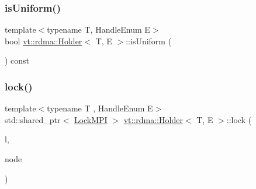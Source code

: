 \mbox{\label{structvt_1_1rdma_1_1_holder_af5a5f41fb16fbf8ee0f7f1b51120cb65}} 
\subsubsection{\texorpdfstring{is\+Uniform()}{isUniform()}}
{\footnotesize\ttfamily template$<$typename T, Handle\+Enum E$>$ \\
bool \hyperlink{structvt_1_1rdma_1_1_holder}{vt\+::rdma\+::\+Holder}$<$ T, E $>$\+::is\+Uniform (\begin{DoxyParamCaption}{ }\end{DoxyParamCaption}) const\hspace{0.3cm}{\ttfamily [inline]}}

\mbox{\label{structvt_1_1rdma_1_1_holder_a31433de5996d42f49a16fe0f05bd51cf}} 
\subsubsection{\texorpdfstring{lock()}{lock()}}
{\footnotesize\ttfamily template$<$typename T , Handle\+Enum E$>$ \\
std\+::shared\+\_\+ptr$<$ \hyperlink{structvt_1_1rdma_1_1_lock_m_p_i}{Lock\+M\+PI} $>$ \hyperlink{structvt_1_1rdma_1_1_holder}{vt\+::rdma\+::\+Holder}$<$ T, E $>$\+::lock (\begin{DoxyParamCaption}\item[{\hyperlink{namespacevt_1_1rdma_ac5c20b41a653e520b6305d4d454ecb70}{Lock}}]{l,  }\item[{\hyperlink{namespacevt_a866da9d0efc19c0a1ce79e9e492f47e2}{vt\+::\+Node\+Type}}]{node }\end{DoxyParamCaption})}

\mbox{\label{structvt_1_1rdma_1_1_holder_ad6edaae632bb4025e8d29f27abfcf81c}} 
